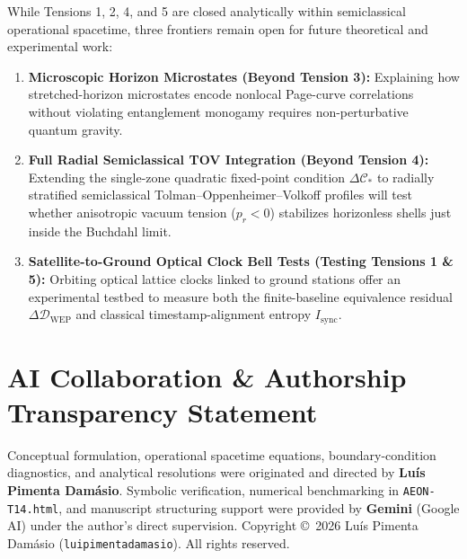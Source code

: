 \documentclass[11pt,a4paper]{article}
\begin{document}
While Tensions 1, 2, 4, and 5 are closed analytically within semiclassical operational spacetime, three frontiers remain open for future theoretical and experimental work:
\begin{enumerate}
    \item \textbf{Microscopic Horizon Microstates (Beyond Tension 3):} Explaining how stretched-horizon microstates encode nonlocal Page-curve correlations \cite{mss2016} without violating entanglement monogamy requires non-perturbative quantum gravity.
    \item \textbf{Full Radial Semiclassical TOV Integration (Beyond Tension 4):} Extending the single-zone quadratic fixed-point condition $\Delta\mathcal{C}_*$ to radially stratified semiclassical Tolman--Oppenheimer--Volkoff profiles will test whether anisotropic vacuum tension ($p_r < 0$) stabilizes horizonless shells just inside the Buchdahl limit.
    \item \textbf{Satellite-to-Ground Optical Clock Bell Tests (Testing Tensions 1 \& 5):} Orbiting optical lattice clocks linked to ground stations offer an experimental testbed to measure both the finite-baseline equivalence residual $\Delta\mathcal{D}_{\mathrm{WEP}}$ and classical timestamp-alignment entropy $I_{\mathrm{sync}}$.
\end{enumerate}

\section*{AI Collaboration \& Authorship Transparency Statement}
Conceptual formulation, operational spacetime equations, boundary-condition diagnostics, and analytical resolutions were originated and directed by \textbf{Luís Pimenta Damásio}. Symbolic verification, numerical benchmarking in \texttt{AEON-T14.html}, and manuscript structuring support were provided by \textbf{Gemini} (Google AI) under the author's direct supervision. Copyright \copyright\ 2026 Luís Pimenta Damásio (\texttt{luipimentadamasio}). All rights reserved.



\end{document}
